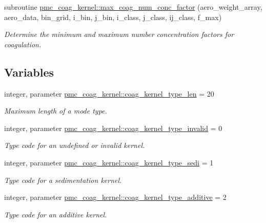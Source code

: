 \begin{DoxyCompactItemize}
subroutine \mbox{\hyperlink{namespacepmc__coag__kernel_aff06e0cba11c675531b31fee88244d74}{pmc\+\_\+coag\+\_\+kernel\+::max\+\_\+coag\+\_\+num\+\_\+conc\+\_\+factor}} (aero\+\_\+weight\+\_\+array, aero\+\_\+data, bin\+\_\+grid, i\+\_\+bin, j\+\_\+bin, i\+\_\+class, j\+\_\+class, ij\+\_\+class, f\+\_\+max)
\begin{DoxyCompactList}\small\item\em Determine the minimum and maximum number concentration factors for coagulation. \end{DoxyCompactList}\end{DoxyCompactItemize}
\subsection*{Variables}
\begin{DoxyCompactItemize}
\item 
integer, parameter \mbox{\hyperlink{namespacepmc__coag__kernel_a5b9c2196146dafb206c5442d2c928559}{pmc\+\_\+coag\+\_\+kernel\+::coag\+\_\+kernel\+\_\+type\+\_\+len}} = 20
\begin{DoxyCompactList}\small\item\em Maximum length of a mode type. \end{DoxyCompactList}\item 
integer, parameter \mbox{\hyperlink{namespacepmc__coag__kernel_a299db166a8c9252d1ee80b1bab04270b}{pmc\+\_\+coag\+\_\+kernel\+::coag\+\_\+kernel\+\_\+type\+\_\+invalid}} = 0
\begin{DoxyCompactList}\small\item\em Type code for an undefined or invalid kernel. \end{DoxyCompactList}\item 
integer, parameter \mbox{\hyperlink{namespacepmc__coag__kernel_acc427a94f9c674be417fa4eb397cd808}{pmc\+\_\+coag\+\_\+kernel\+::coag\+\_\+kernel\+\_\+type\+\_\+sedi}} = 1
\begin{DoxyCompactList}\small\item\em Type code for a sedimentation kernel. \end{DoxyCompactList}\item 
integer, parameter \mbox{\hyperlink{namespacepmc__coag__kernel_a75f7fd7b7f1f6d38bb03828c46e1be66}{pmc\+\_\+coag\+\_\+kernel\+::coag\+\_\+kernel\+\_\+type\+\_\+additive}} = 2
\begin{DoxyCompactList}\small\item\em Type code for an additive kernel. \end{DoxyCompactList}\item 

\end{DoxyCompactItemize}
